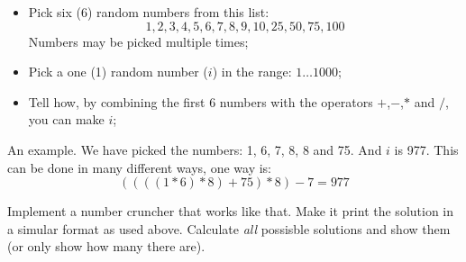 \begin{Exercise}[title={Number cruncher},difficulty=9]
\label{ex:numbercruncher}
\begin{itemize}
\item{Pick six (6) random numbers from this list:
$$1, 2, 3, 4, 5, 6, 7, 8, 9, 10, 25, 50, 75, 100$$
Numbers may be picked multiple times;}
\item{Pick a one (1) random number ($i$) in the range: $1 \ldots 1000$;}
\item{Tell how, by combining the first 6 numbers with the operators
$+$,$-$,$*$ and $/$, you can make $i$;}
\end{itemize}
An example. We have picked the numbers: 1, 6, 7, 8, 8 and 75. And $i$ is
977. This can be done in many different ways, one way is:
$$ ((((1 * 6) * 8) + 75) * 8) - 7 = 977$$

\Question\label{ex:cruncher q1}
Implement a number cruncher that works like that. Make it print the
solution in a simular format as used above.
\Question\label{ex:cruncher q2}
Calculate \emph{all} possisble solutions and show them (or only show how
many there are).
\end{Exercise}

\begin{Answer}
\Question 
\end{Answer}
